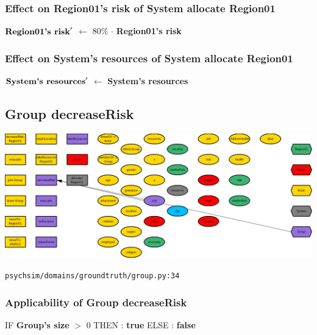 \documentclass{article}%
\begin{document}
%
\subsubsection{Effect on Region01's risk of System allocate Region01}%
\label{ssubsec:Effect on Region01's risk of System allocate Region01}%
\begin{flushleft}%
$\mbox{\textbf{Region01's risk}} '$%
$\leftarrow$%
80\%%
$\cdot$%
\textbf{Region01's risk}%
\end{flushleft}

%
\subsubsection{Effect on System's resources of System allocate Region01}%
\label{ssubsec:Effect on System's resources of System allocate Region01}%
\begin{flushleft}%
$\mbox{\textbf{System's resources}} '$%
$\leftarrow$%
\textbf{System's resources}%
\end{flushleft}

%
\subsection{Group decreaseRisk}%
\label{subsec:Group decreaseRisk}%
\includegraphics[width=\textwidth]{images/Group-decreaseRisk.png}%
\begin{flushleft}%
\verb|psychsim/domains/groundtruth/group.py:34|%
\end{flushleft}%
\subsubsection{Applicability of Group decreaseRisk}%
\label{ssubsec:Applicability of Group decreaseRisk}%
\begin{flushleft}%
IF %
\textbf{Group's size}%
$>$%
0%
\linebreak%
\hspace*{2em}%
THEN %
: %
\textbf{true}%
\linebreak%
\hspace*{2em}%
ELSE %
: %
\textbf{false}%
\end{flushleft}
\end{document}
